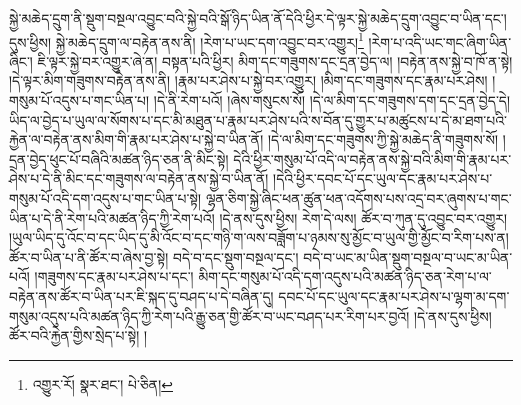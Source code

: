 སྐྱེ་མཆེད་དྲུག་ནི་སྡུག་བསྔལ་འབྱུང་བའི་སྐྱེ་བའི་སྒོ་ཉིད་ཡིན་ནོ་དེའི་ཕྱིར་དེ་ལྟར་སྐྱེ་མཆེད་དྲུག་འབྱུང་བ་ཡིན་དང་། དུས་ཕྱིས། སྐྱེ་མཆེད་དྲུག་ལ་བརྟེན་ནས་ནི། །རེག་པ་ཡང་དག་འབྱུང་བར་འགྱུར།\footnote{འགྱུར་རོ།  སྣར་ཐང་།  པེ་ཅིན། } །རེག་པ་འདི་ཡང་གང་ཞིག་ཡིན་ཞིང་། ཇི་ལྟར་སྐྱེ་བར་འགྱུར་ཞེ་ན། བསྟན་པའི་ཕྱིར། མིག་དང་གཟུགས་དང་དྲན་བྱེད་ལ། །བརྟེན་ནས་སྐྱེ་བ་ཁོ་ན་སྟེ། །དེ་ལྟར་མིག་གཟུགས་བརྟེན་ནས་ནི། །རྣམ་པར་ཤེས་པ་སྐྱེ་བར་འགྱུར། །མིག་དང་གཟུགས་དང་རྣམ་པར་ཤེས། །གསུམ་པོ་འདུས་པ་གང་ཡིན་པ། །དེ་ནི་རེག་པའོ། །ཞེས་གསུངས་སོ། །དེ་ལ་མིག་དང་གཟུགས་དག་དང་དྲན་བྱེད་དེ། ཡིད་ལ་བྱེད་པ་ཡུལ་ལ་སོགས་པ་དང་མི་མཐུན་པ་རྣམ་པར་ཤེས་པའི་ས་བོན་དུ་གྱུར་པ་མཚུངས་པ་དེ་མ་ཐག་པའི་རྐྱེན་ལ་བརྟེན་ནས་མིག་གི་རྣམ་པར་ཤེས་པ་སྐྱེ་བ་ཡིན་ནོ། །དེ་ལ་མིག་དང་གཟུགས་ཀྱི་སྐྱེ་མཆེད་ནི་གཟུགས་སོ། །དྲན་བྱེད་ཕུང་པོ་བཞིའི་མཚན་ཉིད་ཅན་ནི་མིང་སྟེ། དེའི་ཕྱིར་གསུམ་པོ་འདི་ལ་བརྟེན་ནས་སྐྱེ་བའི་མིག་གི་རྣམ་པར་ཤེས་པ་དེ་ནི་མིང་དང་གཟུགས་ལ་བརྟེན་ནས་སྐྱེ་བ་ཡིན་ནོ། །དེའི་ཕྱིར་དབང་པོ་དང་ཡུལ་དང་རྣམ་པར་ཤེས་པ་གསུམ་པོ་འདི་དག་འདུས་པ་གང་ཡིན་པ་སྟེ། ལྷན་ཅིག་སྐྱེ་ཞིང་ཕན་ཚུན་ཕན་འདོགས་པས་འདྲ་བར་ཞུགས་པ་གང་ཡིན་པ་དེ་ནི་རེག་པའི་མཚན་ཉིད་ཀྱི་རེག་པའོ། །དེ་ནས་དུས་ཕྱིས། རེག་དེ་ལས། ཚོར་བ་ཀུན་དུ་འབྱུང་བར་འགྱུར། །ཡུལ་ཡིད་དུ་འོང་བ་དང་ཡིད་དུ་མི་འོང་བ་དང་གཉི་ག་ལས་བཟློག་པ་ཉམས་སུ་མྱོང་བ་ཡུལ་གྱི་མྱོང་བ་རིག་པས་ན། ཚོར་བ་ཡིན་པ་ནི་ཚོར་བ་ཞེས་བྱ་སྟེ། བདེ་བ་དང་སྡུག་བསྔལ་དང་། བདེ་བ་ཡང་མ་ཡིན་སྡུག་བསྔལ་བ་ཡང་མ་ཡིན་པའོ། །གཟུགས་དང་རྣམ་པར་ཤེས་པ་དང་། མིག་དང་གསུམ་པོ་འདི་དག་འདུས་པའི་མཚན་ཉིད་ཅན་རེག་པ་ལ་བརྟེན་ནས་ཚོར་བ་ཡིན་པར་ཇི་སྐད་དུ་བཤད་པ་དེ་བཞིན་དུ། དབང་པོ་དང་ཡུལ་དང་རྣམ་པར་ཤེས་པ་ལྷག་མ་དག་གསུམ་འདུས་པའི་མཚན་ཉིད་ཀྱི་རེག་པའི་རྒྱུ་ཅན་གྱི་ཚོར་བ་ཡང་བཤད་པར་རིག་པར་བྱའོ། །དེ་ནས་དུས་ཕྱིས། ཚོར་བའི་རྐྱེན་གྱིས་སྲེད་པ་སྟེ། །
